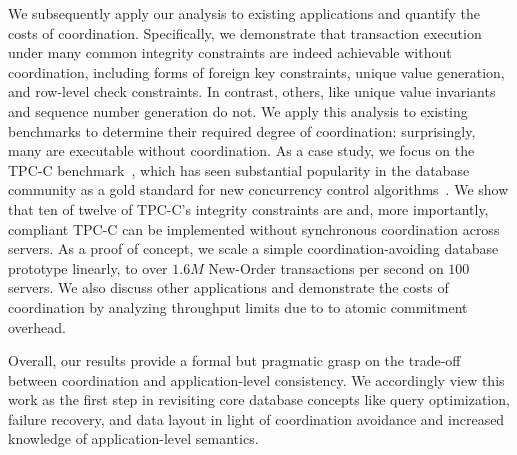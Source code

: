 
We subsequently apply our \iconfluence analysis to existing
applications and quantify the costs of coordination. Specifically, we
demonstrate that transaction execution under many common integrity
constraints are indeed achievable without coordination, including
forms of foreign key constraints, unique value generation, and
row-level check constraints. In contrast, others, like unique value
invariants and sequence number generation do not. We apply this
analysis to existing benchmarks to determine their required degree of
coordination: surprisingly, many are executable without
coordination. As a case study, we focus on the TPC-C
benchmark~\cite{tpcc}, which has seen substantial popularity in the
database community as a gold standard for new concurrency control
algorithms~\cite{abadi-vll,jones-dtxn,schism,calvin,hstore,oltpbench}. We
show that ten of twelve of TPC-C's integrity constraints are
\iconfluent and, more importantly, compliant TPC-C can be implemented
without synchronous coordination across servers. As a proof of
concept, we scale a simple coordination-avoiding database prototype
linearly, to over $1.6M$ New-Order transactions per second on $100$
servers. We also discuss other applications and demonstrate the costs
of coordination by analyzing throughput limits due to to atomic
commitment overhead.

Overall, our results provide a formal but pragmatic grasp on the
trade-off between coordination and application-level consistency. We
accordingly view this work as the first step in revisiting core
database concepts like query optimization, failure recovery, and data
layout in light of coordination avoidance and increased knowledge of
application-level semantics.


